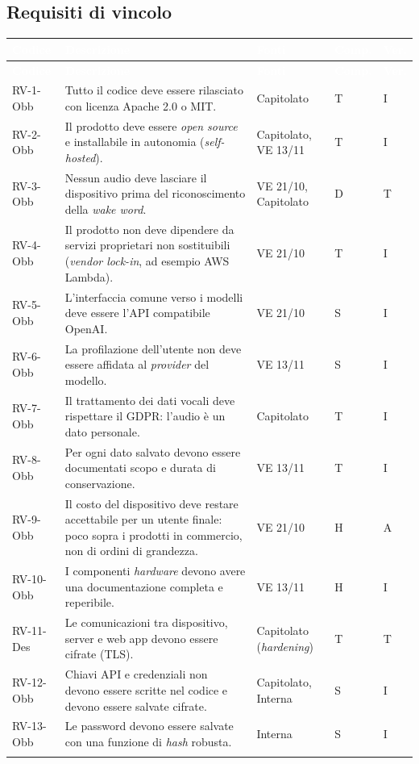 \documentclass[12pt,a4paper]{article}
\newcommand{\thc}[1]{\textcolor{white}{\textbf{#1}}}
\newcommand{\rl}{\\ \arrayrulecolor{bfline}\hline}
\begin{document}
\subsection{Requisiti di vincolo}

\begin{longtable}{>{\raggedright\arraybackslash}p{}>{\raggedright\arraybackslash}p{}>{\raggedright\arraybackslash}p{}>{\raggedright\arraybackslash}p{}>{\centering\arraybackslash}p{}}
\rowcolor{bfblue}\thc{Codice} & \thc{Descrizione} & \thc{Fonti} & \thc{Comp.} & \thc{Ver.} \\
\endfirsthead
\rowcolor{bfblue}\thc{Codice} & \thc{Descrizione} & \thc{Fonti} & \thc{Comp.} & \thc{Ver.} \\
\endhead
RV-1-Obb & Tutto il codice deve essere rilasciato con licenza Apache 2.0 o MIT. & Capitolato & T & I \rl
RV-2-Obb & Il prodotto deve essere \emph{open source} e installabile in autonomia (\emph{self-hosted}). & Capitolato, VE 13/11 & T & I \rl
RV-3-Obb & Nessun audio deve lasciare il dispositivo prima del riconoscimento della \emph{wake word}. & VE 21/10, Capitolato & D & T \rl
RV-4-Obb & Il prodotto non deve dipendere da servizi proprietari non sostituibili (\emph{vendor lock-in}, ad esempio AWS Lambda). & VE 21/10 & T & I \rl
RV-5-Obb & L'interfaccia comune verso i modelli deve essere l'API compatibile OpenAI. & VE 21/10 & S & I \rl
RV-6-Obb & La profilazione dell'utente non deve essere affidata al \emph{provider} del modello. & VE 13/11 & S & I \rl
RV-7-Obb & Il trattamento dei dati vocali deve rispettare il GDPR: l'audio è un dato personale. & Capitolato & T & I \rl
RV-8-Obb & Per ogni dato salvato devono essere documentati scopo e durata di conservazione. & VE 13/11 & T & I \rl
RV-9-Obb & Il costo del dispositivo deve restare accettabile per un utente finale: poco sopra i prodotti in commercio, non di ordini di grandezza. & VE 21/10 & H & A \rl
RV-10-Obb & I componenti \emph{hardware} devono avere una documentazione completa e reperibile. & VE 13/11 & H & I \rl
RV-11-Des & Le comunicazioni tra dispositivo, server e web app devono essere cifrate (TLS). & Capitolato (\emph{hardening}) & T & T \rl
RV-12-Obb & Chiavi API e credenziali non devono essere scritte nel codice e devono essere salvate cifrate. & Capitolato, Interna & S & I \rl
RV-13-Obb & Le password devono essere salvate con una funzione di \emph{hash} robusta. & Interna & S & I \rl

\end{longtable}
\end{document}
